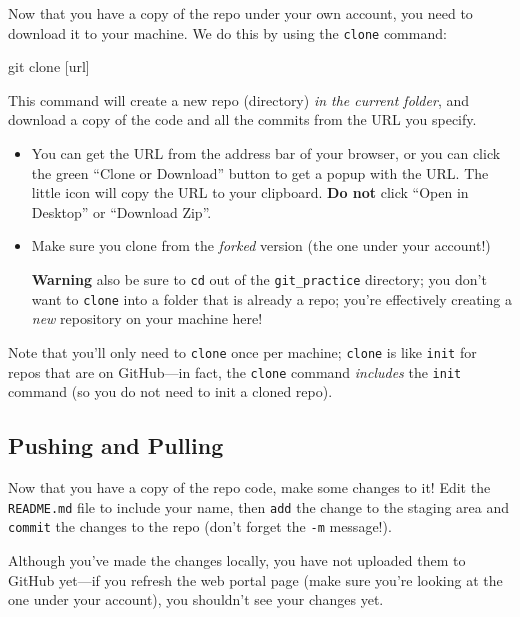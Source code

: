 \documentclass[]{book}
\newenvironment{Shaded}{\begin{snugshade}}{\end{snugshade}}
\newcommand{\FunctionTok}[1]{\textcolor[rgb]{0.00,0.00,0.00}{#1}}
\newcommand{\NormalTok}[1]{#1}
\theoremstyle{definition}
\theoremstyle{definition}
\theoremstyle{remark}
\begin{document}
Now that you have a copy of the repo under your own account, you need to
download it to your machine. We do this by using the \texttt{clone}
command:

\begin{Shaded}
\begin{Highlighting}[]
\FunctionTok{git}\NormalTok{ clone [url]}
\end{Highlighting}
\end{Shaded}

This command will create a new repo (directory) \emph{in the current
folder}, and download a copy of the code and all the commits from the
URL you specify.

\begin{itemize}
\item
  You can get the URL from the address bar of your browser, or you can
  click the green ``Clone or Download'' button to get a popup with the
  URL. The little icon will copy the URL to your clipboard. \textbf{Do
  not} click ``Open in Desktop'' or ``Download Zip''.
\item
  Make sure you clone from the \emph{forked} version (the one under your
  account!)

  \textbf{Warning} also be sure to \texttt{cd} out of the
  \texttt{git\_practice} directory; you don't want to \texttt{clone}
  into a folder that is already a repo; you're effectively creating a
  \emph{new} repository on your machine here!
\end{itemize}

Note that you'll only need to \texttt{clone} once per machine;
\texttt{clone} is like \texttt{init} for repos that are on GitHub---in
fact, the \texttt{clone} command \emph{includes} the \texttt{init}
command (so you do not need to init a cloned repo).

\subsection{Pushing and Pulling}\label{pushing-and-pulling}

Now that you have a copy of the repo code, make some changes to it! Edit
the \texttt{README.md} file to include your name, then \texttt{add} the
change to the staging area and \texttt{commit} the changes to the repo
(don't forget the \texttt{-m} message!).

Although you've made the changes locally, you have not uploaded them to
GitHub yet---if you refresh the web portal page (make sure you're
looking at the one under your account), you shouldn't see your changes
yet.
\end{document}
